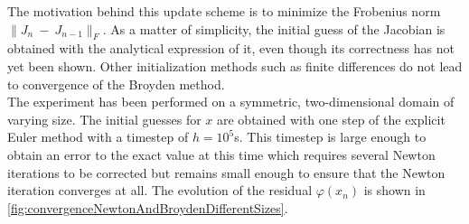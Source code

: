 The motivation behind this update scheme is to minimize the Frobenius norm $\|J_n~-~J_{n-1}\|_F$. As a matter of simplicity, the initial guess of the Jacobian is obtained with the analytical expression of it, even though its correctness has not yet been shown. Other initialization methods such as finite differences do not lead to convergence of the Broyden method. \\
The experiment has been performed on a symmetric, two-dimensional domain of varying size. The initial guesses for $x$ are obtained with one step of the explicit Euler method with a timestep of $h = 10^5$s. This timestep is large enough to obtain an error to the exact value at this time which requires several Newton iterations to be corrected but remains small enough to ensure that the Newton iteration converges at all. The evolution of the residual $\varphi(x_n)$ is shown in \autoref{fig:convergenceNewtonAndBroydenDifferentSizes}.

